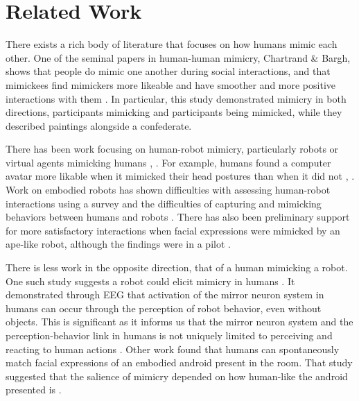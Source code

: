 \documentclass{acm_proc_article-sp}
\begin{document}
\section{Related Work}
There exists a rich body of literature that focuses on how humans mimic each other. One of the seminal papers in human-human mimicry, Chartrand \& Bargh, shows that people do mimic one another during social interactions, and that mimickees find mimickers more likeable and have smoother and more positive interactions with them \cite{chartrand1999chameleon}. In particular, this study demonstrated mimicry in both directions, participants mimicking and participants being mimicked, while they described paintings alongside a confederate.

There has been work focusing on human-robot mimicry, particularly robots or virtual agents mimicking humans \cite{bailenson2005digital}, \cite{riek2010my}. For example, humans found a computer avatar more likable when it mimicked their head postures than when it did not \cite{bailenson2005digital}, \cite{chartrand2013antecedents}. Work on embodied robots has shown difficulties with assessing human-robot interactions using a survey and the difficulties of capturing and mimicking behaviors between humans and robots \cite{riek2010my}. There has also been preliminary support for more satisfactory interactions when facial expressions were mimicked by an ape-like robot, although the findings were in a pilot \cite{riek2008real}.

There is less work in the opposite direction, that of a human mimicking a robot. One such study suggests a robot could elicit mimicry in humans \cite{oberman2007eeg}. It demonstrated through EEG that activation of the mirror neuron system in humans can occur through the perception of robot behavior, even without objects. This is significant as it informs us that the mirror neuron system and the perception-behavior link in humans is not uniquely limited to perceiving and reacting to human actions \cite{oberman2007eeg}. Other work found that humans can spontaneously match facial expressions of an embodied android present in the room. That study suggested that the salience of mimicry depended on how human-like the android presented is \cite{hofree2014bridging}.
\end{document}

